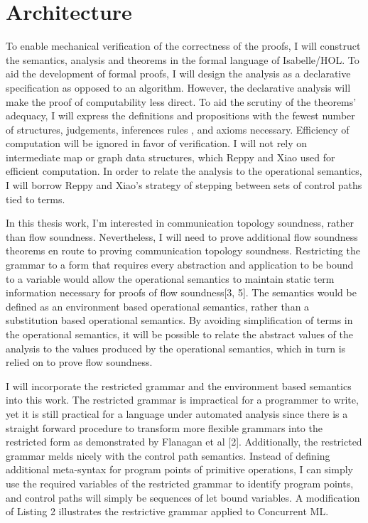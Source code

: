 \section{Architecture}
To enable mechanical verification of the correctness of the proofs, I will construct the
semantics, analysis and theorems in the formal language of Isabelle/HOL.  To aid the
development of formal proofs, I will design the analysis as a declarative specification as
opposed to an algorithm.  However, the declarative analysis will make the proof of
computability less direct.  To aid the scrutiny of the theorems' adequacy, I will express the
definitions and propositions with the fewest number of structures, judgements, inferences rules
, and axioms necessary.  Efficiency of computation will be ignored in favor of verification.
I will not rely on intermediate map or graph data structures, which Reppy and Xiao used for
efficient computation.  In order to relate the analysis to the operational semantics, I will
borrow Reppy and Xiao's strategy of stepping between sets of control paths tied to terms.

In this thesis work, I'm interested in communication topology soundness, rather than flow
soundness.  Nevertheless, I will need to prove additional flow soundness theorems en route to
proving communication topology soundness.  Restricting the grammar to a form that requires
every abstraction and application to be bound to a variable would allow the operational
semantics to maintain static term information necessary for proofs of flow soundness[3, 5].
The semantics would be defined as an environment based operational semantics, rather than a
substitution based operational semantics.  By avoiding simplification of terms in the
operational semantics, it will be possible to relate the abstract values of the analysis to the
values produced by the operational semantics, which in turn is relied on to prove flow
soundness.


I will incorporate the restricted grammar and the environment based semantics into this work.
The restricted grammar is impractical for a programmer to write, yet it is still practical for
a language under automated analysis since there is a straight forward procedure to transform
more flexible grammars into the restricted form as demonstrated by Flanagan et al [2].
Additionally, the restricted grammar melds nicely with the control path semantics.  Instead of
defining additional meta-syntax for program points of primitive operations, I can simply use
the required variables of the restricted grammar to identify program points, and control paths
will simply be sequences of let bound variables. A modification of Listing 2 illustrates the
restrictive grammar applied to Concurrent ML.


